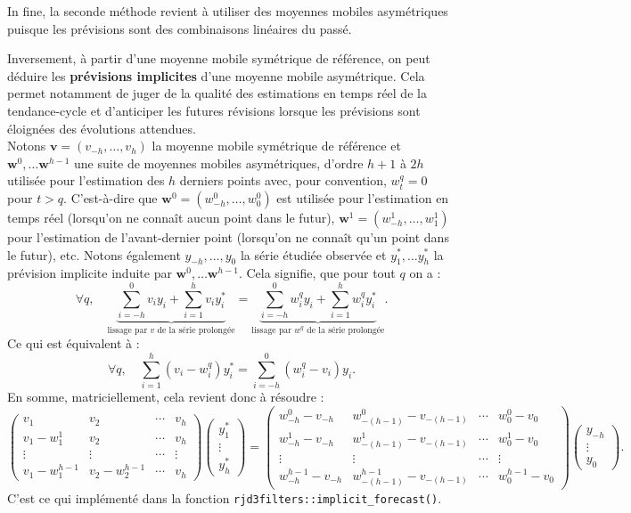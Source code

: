 \documentclass[
  12pt,
  a4paper,french]{article}
\newcommand\1{\mathds{1}}
\begin{document}
In fine, la seconde méthode revient à utiliser des moyennes mobiles asymétriques puisque les prévisions sont des combinaisons linéaires du passé.

Inversement, à partir d'une moyenne mobile symétrique de référence, on peut déduire les \textbf{prévisions implicites} d'une moyenne mobile asymétrique.
Cela permet notamment de juger de la qualité des estimations en temps réel de la tendance-cycle et d'anticiper les futures révisions lorsque les prévisions sont éloignées des évolutions attendues.\\
Notons \(\boldsymbol v=(v_{-h},\dots, v_{h})\) la moyenne mobile symétrique de référence et \(\boldsymbol w^0,\dots \boldsymbol w^{h-1}\) une suite de moyennes mobiles asymétriques, d'ordre \(h+1\) à \(2h\) utilisée pour l'estimation des \(h\) derniers points avec, pour convention, \(w_t^q=0\) pour \(t>q\).
C'est-à-dire que \(\boldsymbol w^0=(w_{-h}^0,\dots, w_{0}^0)\) est utilisée pour l'estimation en temps réel (lorsqu'on ne connaît aucun point dans le futur), \(\boldsymbol w^1=(w_{-h}^1,\dots, w_{1}^1)\) pour l'estimation de l'avant-dernier point (lorsqu'on ne connaît qu'un point dans le futur), etc.
Notons également \(y_{-h},\dots,y_{0}\) la série étudiée observée et \(y_{1}^*,\dots y_h^*\) la prévision implicite induite par \(\boldsymbol w^0,\dots \boldsymbol w^{h-1}\).
Cela signifie, que pour tout \(q\) on a :
\[
\forall q, \quad \underbrace{\sum_{i=-h}^0 v_iy_i + \sum_{i=1}^h v_iy_i^*}_{\text{lissage par }v\text{ de la série prolongée}}
=\underbrace{\sum_{i=-h}^0 w_i^qy_i + \sum_{i=1}^h w_i^qy_i^*}_{\text{lissage par }w^q\text{ de la série prolongée}}.
\]
Ce qui est équivalent à :
\[
\forall q, \quad \sum_{i=1}^h (v_i- w_i^q) y_i^*
=\sum_{i=-h}^0 (w_i^q-v_i)y_i.
\]
En somme, matriciellement, cela revient donc à résoudre :
\[\scriptstyle
\begin{pmatrix}
  v_1 & v_2 & \cdots & v_h \\
  v_1 - w_1^1 & v_2 & \cdots & v_h \\
  \vdots & \vdots & \cdots & \vdots \\
   v_1 - w_1^{h-1} & v_2-w_2^{h-1} & \cdots & v_h
\end{pmatrix}
\begin{pmatrix}y_1^* \\ \vdots \\ y_h^*\end{pmatrix}=
\begin{pmatrix}
  w_{-h}^0 - v_{-h} & w_{-(h-1)}^0 - v_{-(h-1)} & \cdots & w_{0}^0 - v_{0} \\
  w_{-h}^1 - v_{-h} & w_{-(h-1)}^1 - v_{-(h-1)} & \cdots & w_{0}^1 - v_{0} \\
  \vdots & \vdots & \cdots & \vdots \\
  w_{-h}^{h-1} - v_{-h} & w_{-(h-1)}^{h-1} - v_{-(h-1)} & \cdots & w_{0}^{h-1} - v_{0}
\end{pmatrix}
\begin{pmatrix}y_{-h} \\ \vdots \\ y_0\end{pmatrix}.\]
C'est ce qui implémenté dans la fonction \texttt{rjd3filters::implicit\_forecast()}.
\end{document}
